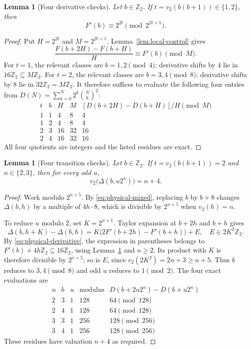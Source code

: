 \documentclass[11pt]{article}
\newtheorem{lemma}[theorem]{Lemma}
\theoremstyle{remark}\newtheorem{remark}[theorem]{Remark}
\newcommand{\Ztwo}{\mathbb Z_2}\newcommand{\Qtwo}{\mathbb Q_2}
\begin{document}
\begin{lemma}[Four derivative checks]\label{lem:four-derivatives}
Let $b\in\Ztwo$. If $t=v_2(b(b+1))\in\{1,2\}$, then
\[
F'(b)\equiv2^{2t}\pmod{2^{2t+1}}.
\]
\end{lemma}
\begin{proof}
Put $H=2^{2t}$ and $M=2^{2t+1}$. Lemma~\ref{lem:local-control} gives
\[
\frac{F(b+2H)-F(b+H)}{H}\equiv F'(b)\pmod{M}.
\]
For $t=1$, the relevant classes are $b=1,2\pmod4$; derivative shifts
by $4$ lie in $16\mathbb Z_2\subseteq M\mathbb Z_2$.
For $t=2$, the relevant classes are $b=3,4\pmod8$; derivative shifts
by $8$ lie in $32\mathbb Z_2=M\mathbb Z_2$.
It therefore suffices to evaluate the following four entries from
$D(N)=\sum_{k=0}^{N}2^k\binom Nk^2$:
\[
\begin{array}{c|c|c|c|c}
t&b&H&M&[D(b+2H)-D(b+H)]/H\pmod M\\\hline
1&1&4&8&4\\
1&2&4&8&4\\
2&3&16&32&16\\
2&4&16&32&16
\end{array}
\]
All four quotients are integers and the listed residues are exact.
\end{proof}

\begin{lemma}[Four transition checks]\label{lem:four-transitions}
Let $b\in\Ztwo$. If $t=v_2(b(b+1))=2$ and $n\in\{2,3\}$, then for every odd $u$,
\[
v_2\bigl(\Delta(b,u2^n)\bigr)=n+4.
\]
\end{lemma}
\begin{proof}
Work modulo $2^{n+5}$. By \eqref{eq:physical-mixed}, replacing $b$ by
$b+8$ changes $\Delta(b,h)$ by a multiple of $4h\cdot8$, which is
divisible by $2^{n+5}$ when $v_2(h)=n$.

To reduce $u$ modulo $2$, set $K=2^{n+1}$. Taylor expansion at $b+2h$
and $b+h$ gives
\[
\Delta(b,h+K)-\Delta(b,h)
=K\bigl(2F'(b+2h)-F'(b+h)\bigr)+E,
\quad E\in2K^2\mathbb Z_2.
\]
By \eqref{eq:physical-derivative}, the expression in parentheses belongs
to $F'(b)+4h\mathbb Z_2\subseteq16\mathbb Z_2$, using
Lemma~\ref{lem:four-derivatives} and $n\ge2$. Its product with $K$ is
therefore divisible by $2^{n+5}$; so is $E$, since
$v_2(2K^2)=2n+3\ge n+5$.
Thus $b$ reduces to $3,4\pmod8$ and odd $u$ reduces to $1\pmod2$.
The four exact evaluations are
\[
\begin{array}{c|c|c|c|c}
n&b&u&\text{modulus}&D(b+2u2^n)-D(b+u2^n)\\\hline
2&3&1&128&64\pmod{128}\\
2&4&1&128&64\pmod{128}\\
3&3&1&256&128\pmod{256}\\
3&4&1&256&128\pmod{256}
\end{array}
\]
These residues have valuation $n+4$ as required.
\end{proof}
\end{document}
